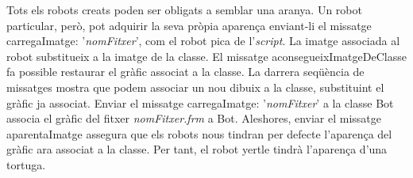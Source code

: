 Tots els robots creats poden ser obligats a semblar una aranya. Un robot particular, però, pot adquirir la seva pròpia aparença enviant-li el missatge \textsf{carregaImatge: '{\itshape nomFitxer}'}, com el robot \textsf{pica} de l'\emph{script}. La imatge associada al robot substitueix a la imatge  de la classe. El missatge \textsf{aconsegueixImatgeDeClasse} fa possible restaurar el gràfic associat a la classe. La darrera seqüència de missatges mostra que podem associar un nou dibuix a la classe, substituint el gràfic ja associat. Enviar el missatge \textsf{carregaImatge: '{\itshape nomFitxer}'} a la classe \textsf{Bot} associa el gràfic del fitxer \textsf{{\itshape nomFitxer.frm}} a \textsf{Bot}. Aleshores, enviar el missatge \textsf{aparentaImatge} assegura que els robots nous tindran per defecte l'aparença del gràfic ara associat a la classe. Per tant, el robot \textsf{yertle} tindrà l'aparença d'una tortuga.  

\newpage
